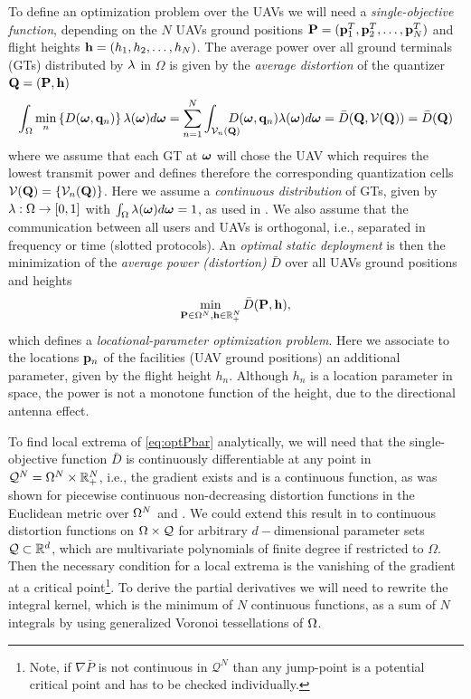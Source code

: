 \documentclass[smallabstract,smallcaptions]{dccpaper}
\newcommand{\disfunction}{distortion function}
\newcommand{\df}{\ensuremath{\lam}}         %
\newcommand{\bH}{\ensuremath{\vh}}          %
\newcommand{\Pbar}{\ensuremath{\bar{P}}}         %
\newcommand{\Vor}{\ensuremath{\mathcal{V}}}         %
\newcommand{\Qset}{\ensuremath{\mathcal Q}}
\newcommand{\Dis}{\ensuremath{D}}                    %
\newcommand{\AvDis}{\ensuremath{\bar{\Dis}}}         %
\begin{document}
To define an optimization problem over the UAVs we will need a \emph{single-objective function}, depending   
on the $N$ UAVs ground positions $\mathbf P =({\mathbf p}_1^T,{\mathbf p}_2^T,\dots,{\mathbf p}^T_N)$ and flight heights
${\mathbf h}=(h_1,h_2,\dots,h_N)$.  The average power over all ground terminals (GTs)
distributed by $\df$ in $\Omega$ is given by the \emph{average distortion} of the quantizer $\mathbf Q=(\mathbf P ,{\mathbf h})$
%
\begin{equation}
 \int_{\Omega}\min_{n} \left\{ \Dis(\vome,\vq_n) \right\} \df(\vome)d\vome = \sum_{n=1}^N \int_{\Vor_n(\vQ)} \!\!\!\!\!\!\!D(\vome,\vq_n)\lam(\vome)d\vome=\AvDis(\vQ,\Vor(\vQ))=\AvDis(\vQ)
  \label{eq:Pbar}
\end{equation}
%
where we assume that each GT at $\boldsymbol{ \omega}$ will chose the UAV which requires the lowest transmit power and defines therefore the corresponding quantization cells $\Vor(\vQ)=\{\Vor_n(\vQ)\}$.
Here  we assume a \emph{continuous distribution} of GTs, given by $\df:\Ome\to[0,1]$ with $\int_{\Omega}\df(\vome)d\vome=1$, as
used in \cite{Erdem16,GJ,GJcom18,GJ18,Erdem1,ML,MLCS}.  We also assume that the
communication between all users and UAVs is orthogonal, i.e., separated in frequency or time (slotted protocols). An
\emph{optimal static deployment} is then the minimization of the \emph{average power (distortion)} $\AvDis$ over all UAVs ground positions and heights
\begin{align}
  \min_{\vP\in\Omega^N, \bH\in\R_+^{N}} \AvDis(\vP,\bH)\label{eq:optPbar},
\end{align}
%
which defines a \emph{locational-parameter optimization problem}.
Here we associate to the locations ${\mathbf p}_n$ of the facilities (UAV ground positions) an additional parameter, given by the
flight height $h_n$.  Although $h_n$ is a location parameter in space, the power is not a monotone function of the
height, due to the directional antenna effect.  


%

To find local extrema of \eqref{eq:optPbar} analytically, we will need that the single-objective function $\AvDis$ is
continuously differentiable at any point in $\Qset^N=\Omega^N\times \R_+^N$, i.e., the gradient exists and is a
continuous function, as was shown for piecewise continuous non-decreasing distortion functions in the Euclidean metric
over $\Omega^N$ \cite[Thm.2.2]{CMB05} and \cite{GJ}. We could extend this result in \cite{WJ18} to continuous
\disfunction s on $\Ome\times\Qset$ for arbitrary $d-$dimensional parameter sets $\Qset\subset \R^d$, which are
multivariate polynomials of finite degree if restricted to $\Omega$.  Then the necessary condition for a local extrema
is the vanishing of the gradient at a critical point\footnote{Note, if $\nabla \Pbar$ is not continuous in $\Qset^N$
than any jump-point is a potential critical point and has to be checked individually.}.  To derive the partial
derivatives we will need to rewrite the integral kernel, which is the minimum of $N$ continuous functions, as a sum of
$N$ integrals by using  generalized Voronoi tessellations of $\Omega$.
%
\end{document}
